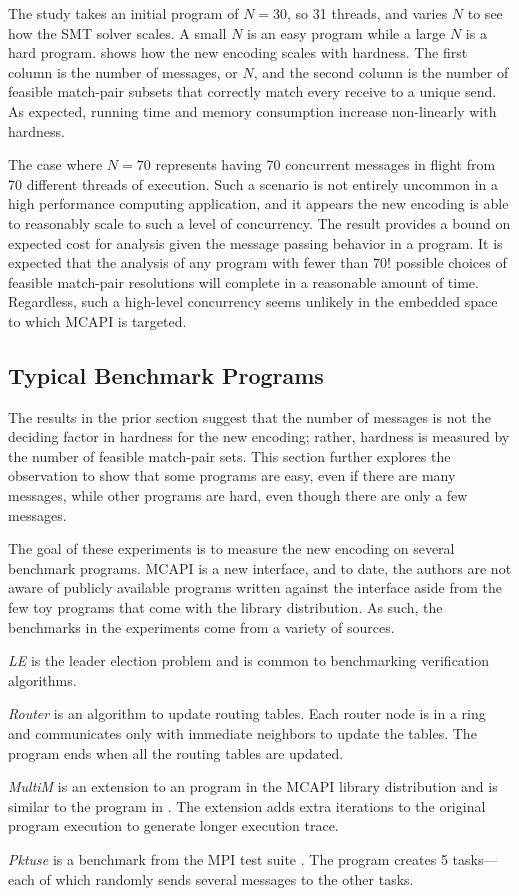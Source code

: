 The study takes an initial program of $N = 30$, so 31 threads, and
varies $N$ to see how the SMT solver scales. A small $N$ is an easy
program while a large $N$ is a hard program. 
shows how the new encoding scales with hardness. The first column is
the number of messages, or $N$, and the second column is the number of
feasible match-pair subsets that correctly match every receive to a
unique send. As expected, running time and memory consumption increase
non-linearly with hardness.

The case where $N=70$ represents having 70 concurrent messages in
flight from 70 different threads of execution. Such a scenario is not
entirely uncommon in a high performance computing application, and it
appears the new encoding is able to reasonably scale to such a level
of concurrency. The result provides a bound on expected cost for
analysis given the message passing behavior in a program. It is
expected that the analysis of any program with fewer than $70!$
possible choices of feasible match-pair resolutions will complete in a
reasonable amount of time. Regardless, such a high-level concurrency
seems unlikely in the embedded space to which MCAPI is targeted.

\subsection{Typical Benchmark Programs}
The results in the prior section suggest that the number of messages
is not the deciding factor in hardness for the new encoding; rather,
hardness is measured by the number of feasible match-pair sets. This
section further explores the observation to show that some programs
are easy, even if there are many messages, while other programs are
hard, even though there are only a few messages.

The goal of these experiments is to measure the new encoding on
several benchmark programs. MCAPI is a new interface, and to date, the
authors are not aware of publicly available programs written against
the interface aside from the few toy programs that come with the
library distribution. As such, the benchmarks in the experiments come
from a variety of sources.
\begin{compactitem}
\item \textit{LE} is the leader election problem and is common to
  benchmarking verification algorithms.
\item \textit{Router} is an algorithm to update routing tables. Each
  router node is in a ring and communicates only with immediate
  neighbors to update the tables. The program ends when all the
  routing tables are updated.
\item \textit{MultiM} is an extension to an program in the MCAPI library
  distribution and is similar to the program in . The extension adds extra
  iterations to the original program execution to generate longer
  execution trace.
\item \textit{Pktuse} is a benchmark from the MPI test suite
  \cite{mpptest_benchmark}. The program creates 5 tasks---each of
  which randomly sends several messages to the other tasks.
\end{compactitem}

